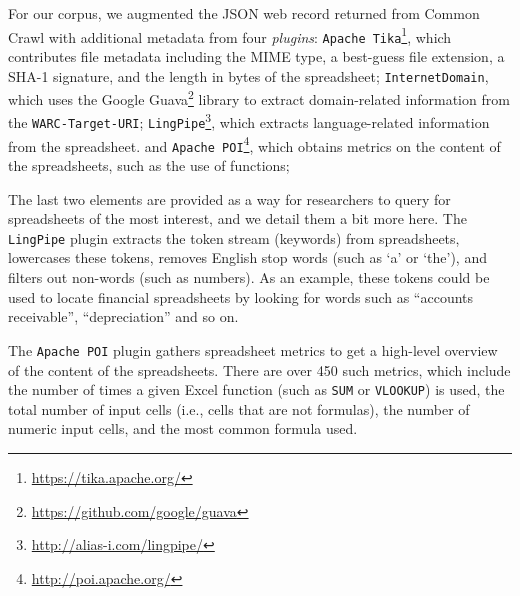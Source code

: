 \documentclass[conference]{IEEEtran}
\begin{document}

For our corpus, we augmented the JSON web record returned from Common Crawl with additional metadata from four \textit{plugins}: 
\texttt{Apache Tika}\footnote{\url{https://tika.apache.org/}}, which contributes file metadata including the MIME type, a best-guess file extension, a SHA-1 signature, and the length in bytes of the spreadsheet;
\texttt{InternetDomain}, which uses the Google Guava\footnote{\url{https://github.com/google/guava}} library to extract domain-related information from the \texttt{WARC-Target-URI};
\texttt{LingPipe}\footnote{\url{http://alias-i.com/lingpipe/}}, which extracts language-related information from the spreadsheet. 
and \texttt{Apache POI}\footnote{\url{http://poi.apache.org/}}, which obtains metrics on the content of the spreadsheets, such as the use of functions;

The last two elements are provided as a way for researchers to query for spreadsheets of the most interest, and we detail them a bit more here.
The \texttt{LingPipe} plugin extracts the token stream (keywords) from spreadsheets, lowercases these tokens, removes English stop words (such as `a' or `the'), and filters out non-words (such as numbers).
As an example, these tokens could be used to locate financial spreadsheets by looking for words such as ``accounts receivable'', ``depreciation'' and so on.

The \texttt{Apache POI} plugin gathers spreadsheet metrics to get a high-level overview of the content of the spreadsheets.
There are over 450 such metrics, which include the number of times a given Excel function (such as \texttt{SUM} or \texttt{VLOOKUP}) is used, the total number of input cells (i.e., cells that are not formulas), the number of numeric input cells, and the most common formula used. 
\end{document}
